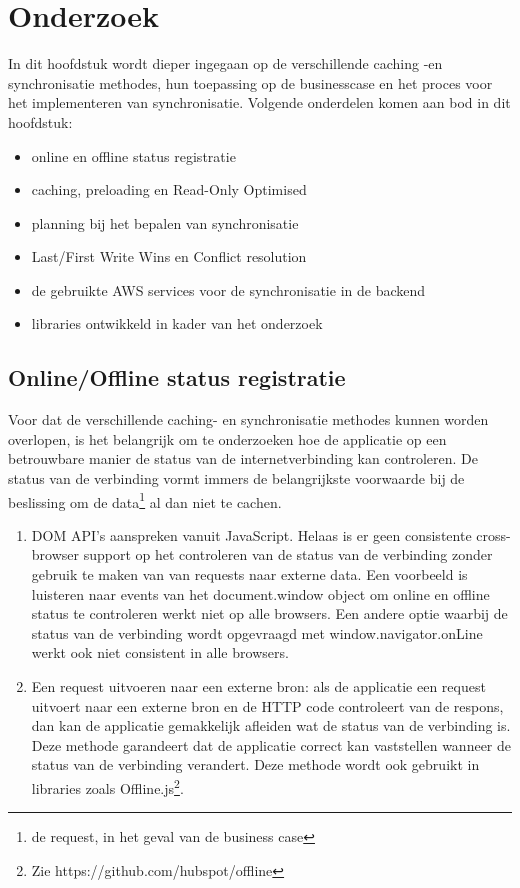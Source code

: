 
\chapter{Onderzoek}
\label{ch:onderzoek}

In dit hoofdstuk wordt dieper ingegaan op de verschillende caching -en synchronisatie methodes, hun toepassing op de businesscase en het proces voor het implementeren van synchronisatie. Volgende onderdelen komen aan bod in dit hoofdstuk:
\begin{itemize}
\item online en offline status registratie
\item caching, preloading en Read-Only Optimised
\item planning bij het bepalen van synchronisatie
\item Last/First Write Wins en Conflict resolution
\item de gebruikte AWS services voor de synchronisatie in de backend
\item libraries ontwikkeld in kader van het onderzoek 
\end{itemize}

\section{Online/Offline status registratie}
Voor dat de verschillende caching- en synchronisatie methodes kunnen worden overlopen, is het belangrijk om te onderzoeken hoe de applicatie op een betrouwbare manier de status van de internetverbinding kan controleren. De status van de verbinding vormt immers de belangrijkste voorwaarde bij de beslissing om de data\footnote{de request, in het geval van de business case}  al dan niet te cachen.
\clearpage
\begin{enumerate}
\item DOM API's aanspreken vanuit JavaScript. Helaas is er geen consistente\autocite{offline-spec-mozilla} cross-browser support op het controleren van de status van de verbinding zonder gebruik te maken van van requests naar externe data. Een voorbeeld is luisteren naar events van het document.window object om online en offline status te controleren werkt niet op alle browsers. Een andere optie waarbij de status van de verbinding wordt opgevraagd met window.navigator.onLine werkt ook niet consistent in alle browsers.
\item Een request uitvoeren naar een externe bron: als de applicatie een request uitvoert naar een externe bron en de HTTP code controleert van de respons, dan kan de applicatie gemakkelijk afleiden wat de status van de verbinding is. Deze methode garandeert dat de applicatie correct kan vaststellen wanneer de status van de verbinding verandert. Deze methode wordt ook gebruikt in libraries zoals Offline.js\footnote{Zie https://github.com/hubspot/offline}.
\end{enumerate}


